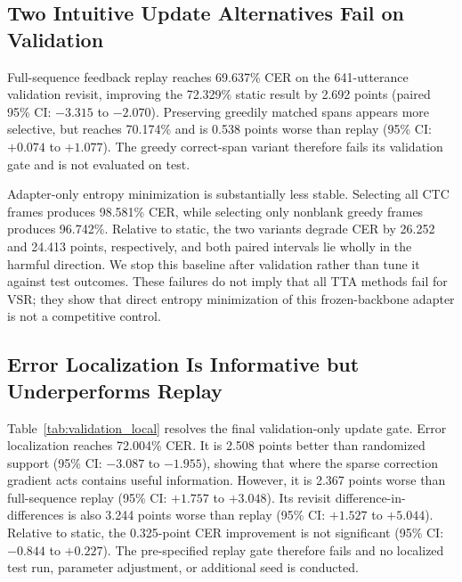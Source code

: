 \subsection{Two Intuitive Update Alternatives Fail on Validation}

Full-sequence feedback replay reaches 69.637\% CER on the 641-utterance validation revisit, improving the 72.329\% static result by 2.692 points (paired 95\% CI: $-3.315$ to $-2.070$). Preserving greedily matched spans appears more selective, but reaches 70.174\% and is 0.538 points worse than replay (95\% CI: $+0.074$ to $+1.077$). The greedy correct-span variant therefore fails its validation gate and is not evaluated on test.

Adapter-only entropy minimization is substantially less stable. Selecting all CTC frames produces 98.581\% CER, while selecting only nonblank greedy frames produces 96.742\%. Relative to static, the two variants degrade CER by 26.252 and 24.413 points, respectively, and both paired intervals lie wholly in the harmful direction. We stop this baseline after validation rather than tune it against test outcomes. These failures do not imply that all TTA methods fail for VSR; they show that direct entropy minimization of this frozen-backbone adapter is not a competitive control.

\subsection{Error Localization Is Informative but Underperforms Replay}

Table~\ref{tab:validation_local} resolves the final validation-only update gate. Error localization reaches 72.004\% CER. It is 2.508 points better than randomized support (95\% CI: $-3.087$ to $-1.955$), showing that where the sparse correction gradient acts contains useful information. However, it is 2.367 points worse than full-sequence replay (95\% CI: $+1.757$ to $+3.048$). Its revisit difference-in-differences is also 3.244 points worse than replay (95\% CI: $+1.527$ to $+5.044$). Relative to static, the 0.325-point CER improvement is not significant (95\% CI: $-0.844$ to $+0.227$). The pre-specified replay gate therefore fails and no localized test run, parameter adjustment, or additional seed is conducted.

